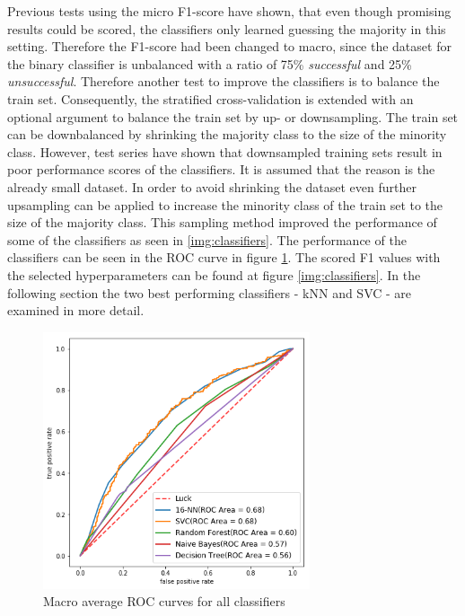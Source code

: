 Previous tests using the micro F1-score have shown, that even though promising results could be scored, the classifiers only learned guessing the majority in this setting. Therefore the F1-score had been changed to macro,
 since the dataset for the binary classifier is unbalanced with a ratio of 75\% \textit{successful} and 25\% \textit{unsuccessful}. Therefore another test to improve the classifiers is to balance the train set.
Consequently, the stratified cross-validation is extended with an optional argument to balance the train set by up- or downsampling.
The train set can be downbalanced by shrinking the majority class to the size of the minority class. However, test series have shown that downsampled training sets result in poor performance scores of the classifiers. It is assumed that the reason is the already small dataset.
In order to avoid shrinking the dataset even further upsampling can be applied to increase the minority class of the train set to the size of the majority class. This sampling method improved the performance of some of the classifiers as seen in \ref{img:classifiers}.
The performance of the classifiers can be seen in the ROC curve in figure \ref{img:roc}. The scored F1 values with the selected hyperparameters can be found at figure \ref{img:classifiers}.
In the following section the two best performing classifiers - kNN and SVC - are examined in more detail.
\begin{figure}[h]
	\center
	\includegraphics[width=0.7\textwidth]{images/roc.png}
	\caption{Macro average ROC curves for all classifiers}
	\label{img:roc}
\end{figure}
